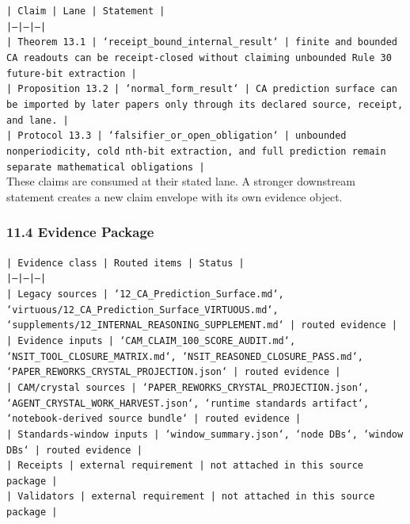\documentclass[11pt]{article}
\begin{document}
\noindent\texttt{| Claim | Lane | Statement |}\\
\noindent\texttt{|---|---|---|}\\
\noindent\texttt{| Theorem 13.1 | `receipt\_bound\_internal\_result` | finite and bounded CA readouts can be receipt-closed without claiming unbounded Rule 30 future-bit extraction |}\\
\noindent\texttt{| Proposition 13.2 | `normal\_form\_result` | CA prediction surface can be imported by later papers only through its declared source, receipt, and lane. |}\\
\noindent\texttt{| Protocol 13.3 | `falsifier\_or\_open\_obligation` | unbounded nonperiodicity, cold nth-bit extraction, and full prediction remain separate mathematical obligations |}\\

These claims are consumed at their stated lane. A stronger downstream statement
creates a new claim envelope with its own evidence object.

\subsubsection*{11.4 Evidence Package}

\noindent\texttt{| Evidence class | Routed items | Status |}\\
\noindent\texttt{|---|---|---|}\\
\noindent\texttt{| Legacy sources | `12\_CA\_Prediction\_Surface.md`, `virtuous/12\_CA\_Prediction\_Surface\_VIRTUOUS.md`, `supplements/12\_INTERNAL\_REASONING\_SUPPLEMENT.md` | routed evidence |}\\
\noindent\texttt{| Evidence inputs | `CAM\_CLAIM\_100\_SCORE\_AUDIT.md`, `NSIT\_TOOL\_CLOSURE\_MATRIX.md`, `NSIT\_REASONED\_CLOSURE\_PASS.md`, `PAPER\_REWORKS\_CRYSTAL\_PROJECTION.json` | routed evidence |}\\
\noindent\texttt{| CAM/crystal sources | `PAPER\_REWORKS\_CRYSTAL\_PROJECTION.json`, `AGENT\_CRYSTAL\_WORK\_HARVEST.json`, `runtime standards artifact`, `notebook-derived source bundle` | routed evidence |}\\
\noindent\texttt{| Standards-window inputs | `window\_summary.json`, `node DBs`, `window DBs` | routed evidence |}\\
\noindent\texttt{| Receipts | external requirement | not attached in this source package |}\\
\noindent\texttt{| Validators | external requirement | not attached in this source package |}\\
\end{document}
